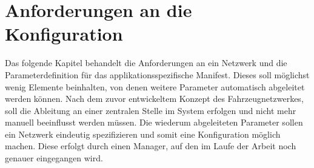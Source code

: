 \chapter{Anforderungen an die Konfiguration}\label{sec:Manifest}
Das folgende Kapitel behandelt die Anforderungen an ein Netzwerk und die Parameterdefinition für das applikationsspezifische Manifest. Dieses soll möglichst wenig Elemente beinhalten, von denen weitere Parameter automatisch abgeleitet werden können. Nach dem zuvor entwickeltem Konzept des Fahrzeugnetzwerkes, soll die Ableitung an einer zentralen Stelle im System erfolgen und nicht mehr manuell beeinflusst werden müssen. Die wiederum abgeleiteten Parameter sollen ein Netzwerk eindeutig spezifizieren und somit eine Konfiguration möglich machen. Diese erfolgt durch einen Manager, auf den im Laufe der Arbeit noch genauer eingegangen wird.




